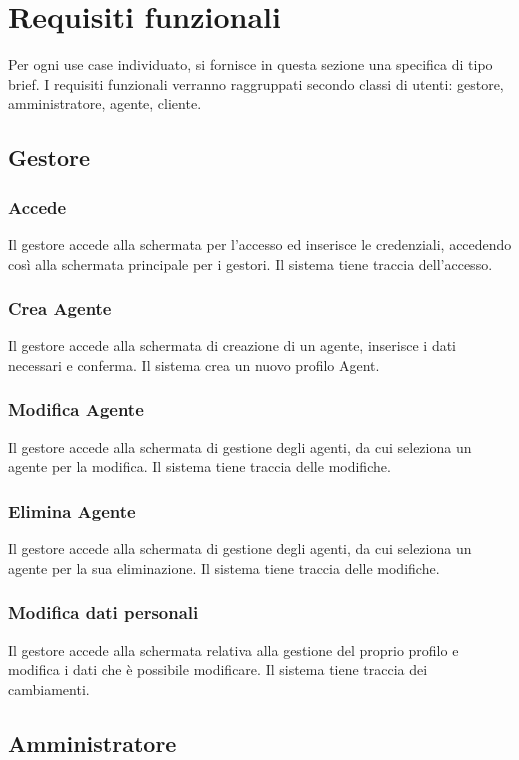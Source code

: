 \section{Requisiti funzionali}
Per ogni use case individuato, si fornisce in questa sezione una
specifica di tipo brief.
I requisiti funzionali verranno raggruppati secondo
classi di utenti: gestore, amministratore, agente, cliente.

\subsection{Gestore}
\subsubsection{Accede}
Il gestore accede alla schermata per l'accesso ed inserisce le credenziali, 
accedendo così alla schermata principale per i gestori. Il sistema tiene 
traccia dell'accesso.

\subsubsection{Crea Agente}
Il gestore accede alla schermata di creazione di un agente, inserisce i 
dati necessari e conferma. Il sistema crea un nuovo profilo Agent.

\subsubsection{Modifica Agente}
Il gestore accede alla schermata di gestione degli agenti, da cui 
seleziona un agente per la modifica. Il sistema tiene traccia delle
modifiche.

\subsubsection{Elimina Agente}
Il gestore accede alla schermata di gestione degli agenti, da cui 
seleziona un agente per la sua eliminazione. Il sistema tiene traccia delle
modifiche.

\subsubsection{Modifica dati personali}
Il gestore accede alla schermata relativa alla gestione del proprio 
profilo e modifica i dati che è possibile modificare. Il sistema 
tiene traccia dei cambiamenti.

\subsection{Amministratore}
